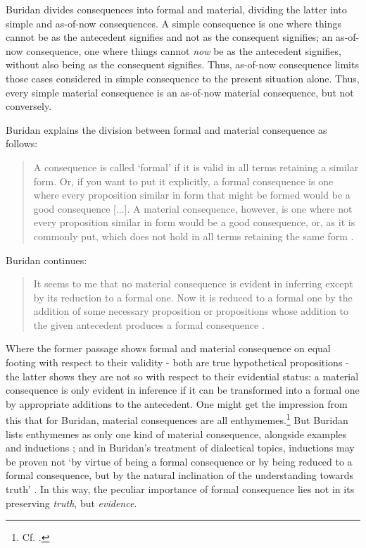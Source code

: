 \documentclass[]{article}
\begin{document}

Buridan divides consequences into formal and material, dividing the latter into simple and as-of-now consequences. A simple consequence is one where things cannot be as the antecedent signifies and not as the consequent signifies; an as-of-now consequence, one where things cannot \textit{now} be as the antecedent signifies, without also being as the consequent signifies. Thus, as-of-now consequence limits those cases considered in simple consequence to the present situation alone. Thus, every simple material consequence is an as-of-now material consequence, but not conversely. 

Buridan explains the division between formal and material consequence as follows: 
\begin{quote}
	A consequence is called `formal' if it is valid in all terms retaining a similar form. Or, if you want to put it explicitly, a formal consequence is one where every proposition similar in form that might be formed would be a good consequence [...]. A material consequence, however, is one where not every proposition similar in form would be a good consequence, or, as it is commonly put, which does not hold in all terms retaining the same form \autocite[I. 4, 68]{Buridan2015}.
\end{quote}

Buridan continues: 
\begin{quote}
	It seems to me that no material consequence is evident in inferring except by its reduction to a formal one. Now it is reduced to a formal one by the addition of some necessary proposition or propositions whose addition to the given antecedent produces a formal consequence \autocite[I. 4, 68]{Buridan2015}.
\end{quote}

Where the former passage shows formal and material consequence on equal footing with respect to their validity - both are true hypothetical propositions - the latter shows they are not so with respect to their evidential status: a material consequence is only evident in inference if it can be transformed into a formal one by appropriate additions to the antecedent. One might get the impression from this that for Buridan, material consequences are all enthymemes.\footnote{Cf. \autocite[66]{BurleyDPAL}.} But Buridan lists enthymemes as only one kind of material consequence, alongside examples and inductions \autocite[III. 1, 113]{Buridan2015}; and in Buridan's treatment of dialectical topics, inductions may be proven not `by virtue of being a formal consequence or by being reduced to a formal consequence, but by the natural inclination of the understanding towards truth' \autocite[6.1.5]{BuridanLoci}. In this way, the peculiar importance of formal consequence lies not in its preserving \textit{truth}, but \textit{evidence}.
\end{document}
